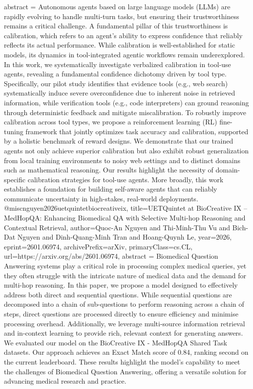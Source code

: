 {      abstract = {Autonomous agents based on large language models (LLMs) are rapidly evolving to handle multi-turn tasks, but ensuring their trustworthiness remains a critical challenge. A fundamental pillar of this trustworthiness is calibration, which refers to an agent's ability to express confidence that reliably reflects its actual performance. While calibration is well-established for static models, its dynamics in tool-integrated agentic workflows remain underexplored. In this work, we systematically investigate verbalized calibration in tool-use agents, revealing a fundamental confidence dichotomy driven by tool type. Specifically, our pilot study identifies that evidence tools (e.g., web search) systematically induce severe overconfidence due to inherent noise in retrieved information, while verification tools (e.g., code interpreters) can ground reasoning through deterministic feedback and mitigate miscalibration. To robustly improve calibration across tool types, we propose a reinforcement learning (RL) fine-tuning framework that jointly optimizes task accuracy and calibration, supported by a holistic benchmark of reward designs. We demonstrate that our trained agents not only achieve superior calibration but also exhibit robust generalization from local training environments to noisy web settings and to distinct domains such as mathematical reasoning. Our results highlight the necessity of domain-specific calibration strategies for tool-use agents. More broadly, this work establishes a foundation for building self-aware agents that can reliably communicate uncertainty in high-stakes, real-world deployments.}
}@misc{nguyen2026uetquintetbiocreativeix,
      title={UETQuintet at BioCreative IX -- MedHopQA: Enhancing Biomedical QA with Selective Multi-hop Reasoning and Contextual Retrieval}, 
      author={Quoc-An Nguyen and Thi-Minh-Thu Vu and Bich-Dat Nguyen and Dinh-Quang-Minh Tran and Hoang-Quynh Le},
      year={2026},
      eprint={2601.06974},
      archivePrefix={arXiv},
      primaryClass={cs.CL},
      url={https://arxiv.org/abs/2601.06974},
      abstract = {Biomedical Question Answering systems play a critical role in processing complex medical queries, yet they often struggle with the intricate nature of medical data and the demand for multi-hop reasoning. In this paper, we propose a model designed to effectively address both direct and sequential questions. While sequential questions are decomposed into a chain of sub-questions to perform reasoning across a chain of steps, direct questions are processed directly to ensure efficiency and minimise processing overhead. Additionally, we leverage multi-source information retrieval and in-context learning to provide rich, relevant context for generating answers. We evaluated our model on the BioCreative IX - MedHopQA Shared Task datasets. Our approach achieves an Exact Match score of 0.84, ranking second on the current leaderboard. These results highlight the model's capability to meet the challenges of Biomedical Question Answering, offering a versatile solution for advancing medical research and practice.}
}
